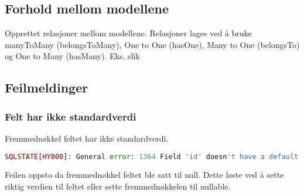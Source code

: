 

\subsection{Forhold mellom modellene}
Opprettet relasjoner mellom modellene. 
Relasjoner lages ved å bruke manyToMany (belongsToMany), One to One (hasOne), Many to One (belongsTo) og One to Many (hasMany). Eks. slik


\subsection{Feilmeldinger}
\subsubsection{Felt har ikke standardverdi}
Fremmednøkkel feltet har ikke standardverdi.
\begin{lstlisting}[language=PHP]
    SQLSTATE[HY000]: General error: 1364 Field 'id' doesn't have a default value (SQL: insert into `fields` (`name`, `slug`, `updated_at`, `created_at`) values (HELLO WORLD, hello_world, 2019-02-06 08:57:48, 2019-02-06 08:57:48))
\end{lstlisting}
Feilen oppsto da fremmednøkkel feltet ble satt til null. Dette løste ved å sette riktig verdien til feltet eller sette fremmednøkkelen til nullable. 

